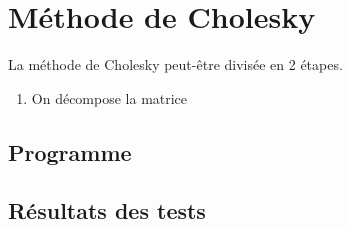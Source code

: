 \documentclass{report}
\begin{document}
        
    \newpage
    \section{Méthode de Cholesky}
      La méthode de Cholesky peut-être divisée en 2 étapes.
      \begin{enumerate}
        \item{On décompose la matrice}
      \end{enumerate}
      \subsection{Programme}
        
      \newpage
      \subsection{Résultats des tests}
      	\renewcommand{\arraystretch}{2}
\end{document}
